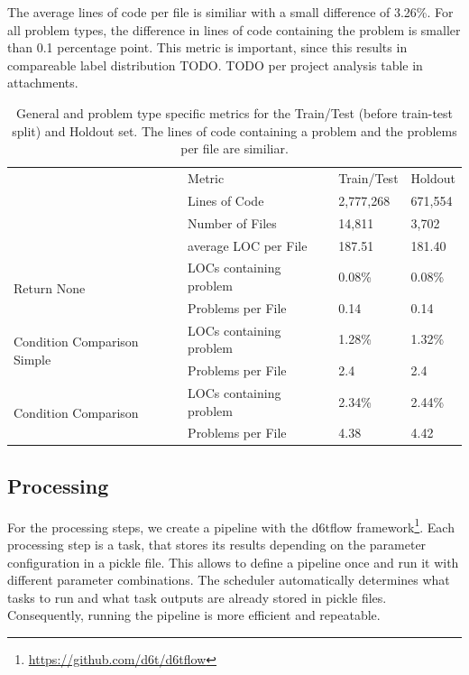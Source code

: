 The average lines of code per file is similiar with a small difference of 3.26\%. For all problem types, the difference in lines of code containing the problem is smaller than 0.1 percentage point. This metric is important, since this results in compareable label distribution TODO.
TODO per project analysis table in attachments.

\begin{table}[]
    \begin{tabular}{@{}llll@{}}
        \toprule
    \multirow{4}{*}{}                            & Metric                  & Train/Test & Holdout \\ \cmidrule(l){2-4} 
                                                 & Lines of Code           & 2,777,268  & 671,554 \\
                                                 & Number of Files         & 14,811     & 3,702   \\
                                                 & average LOC per File    & 187.51     & 181.40     \\ \midrule
    \multirow{2}{*}{Return None}                 & LOCs containing problem & 0.08\%     & 0.08\%  \\
                                                 & Problems per File       & 0.14       & 0.14    \\ \midrule
    \multirow{2}{*}{Condition Comparison Simple} & LOCs containing problem & 1.28\%      & 1.32\%  \\
                                                 & Problems per File       & 2.4       & 2.4    \\ \midrule
    \multirow{2}{*}{Condition Comparison}        & LOCs containing problem & 2.34\%     & 2.44\%  \\
                                                 & Problems per File       & 4.38       & 4.42    \\ \bottomrule
    \end{tabular}
    \caption{General and problem type specific metrics for the Train/Test (before train-test split) and Holdout set. The lines of code containing a problem and the problems per file are similiar.}
    \label{tab:general_data_distribution}
\end{table}

\subsection{Processing}
For the processing steps, we create a pipeline with the d6tflow framework\footnote{\url{https://github.com/d6t/d6tflow}}. Each processing step is a task, that stores its results depending on the parameter configuration in a pickle file. This allows to define a pipeline once and run it with different parameter combinations. The scheduler automatically determines what tasks to run and what task outputs are already stored in pickle files. Consequently, running the pipeline is more efficient and repeatable.

